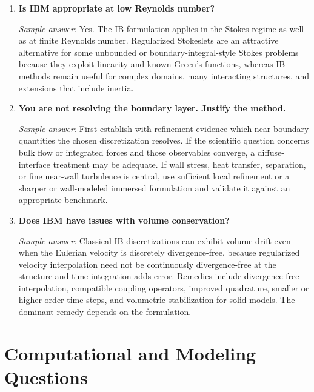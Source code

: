 \documentclass[11pt]{article}
\begin{document}
\begin{enumerate}[label=\arabic*.]
\item \textbf{Is IBM appropriate at low Reynolds number?}

\textit{Sample answer:}  
Yes. The IB formulation applies in the Stokes regime as well as at finite Reynolds number. Regularized Stokeslets are an attractive alternative for some unbounded or boundary-integral-style Stokes problems because they exploit linearity and known Green's functions, whereas IB methods remain useful for complex domains, many interacting structures, and extensions that include inertia.

\item \textbf{You are not resolving the boundary layer. Justify the method.}

\textit{Sample answer:}  
First establish with refinement evidence which near-boundary quantities the chosen discretization resolves. If the scientific question concerns bulk flow or integrated forces and those observables converge, a diffuse-interface treatment may be adequate. If wall stress, heat transfer, separation, or fine near-wall turbulence is central, use sufficient local refinement or a sharper or wall-modeled immersed formulation and validate it against an appropriate benchmark.

\item \textbf{Does IBM have issues with volume conservation?}

\textit{Sample answer:}  
Classical IB discretizations can exhibit volume drift even when the Eulerian velocity is discretely divergence-free, because regularized velocity interpolation need not be continuously divergence-free at the structure and time integration adds error. Remedies include divergence-free interpolation, compatible coupling operators, improved quadrature, smaller or higher-order time steps, and volumetric stabilization for solid models. The dominant remedy depends on the formulation.

\end{enumerate}

\section*{Computational and Modeling Questions}
\end{document}
